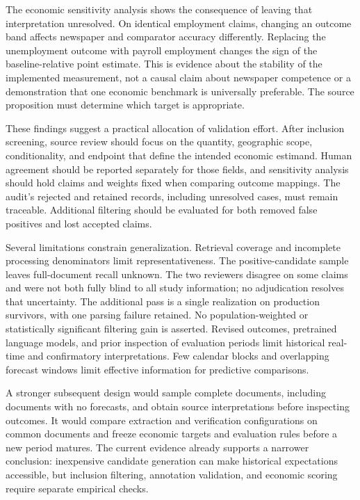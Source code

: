 \documentclass[iicol,pdflatex,sn-mathphys-num]{sn-jnl}
\begin{document}
The economic sensitivity analysis shows the consequence of leaving that interpretation unresolved. On identical employment claims, changing an outcome band affects newspaper and comparator accuracy differently. Replacing the unemployment outcome with payroll employment changes the sign of the baseline-relative point estimate. This is evidence about the stability of the implemented measurement, not a causal claim about newspaper competence or a demonstration that one economic benchmark is universally preferable. The source proposition must determine which target is appropriate.

These findings suggest a practical allocation of validation effort. After inclusion screening, source review should focus on the quantity, geographic scope, conditionality, and endpoint that define the intended economic estimand. Human agreement should be reported separately for those fields, and sensitivity analysis should hold claims and weights fixed when comparing outcome mappings. The audit's rejected and retained records, including unresolved cases, must remain traceable. Additional filtering should be evaluated for both removed false positives and lost accepted claims.

Several limitations constrain generalization. Retrieval coverage and incomplete processing denominators limit representativeness. The positive-candidate sample leaves full-document recall unknown. The two reviewers disagree on some claims and were not both fully blind to all study information; no adjudication resolves that uncertainty. The additional pass is a single realization on production survivors, with one parsing failure retained. No population-weighted or statistically significant filtering gain is asserted. Revised outcomes, pretrained language models, and prior inspection of evaluation periods limit historical real-time and confirmatory interpretations. Few calendar blocks and overlapping forecast windows limit effective information for predictive comparisons.

A stronger subsequent design would sample complete documents, including documents with no forecasts, and obtain source interpretations before inspecting outcomes. It would compare extraction and verification configurations on common documents and freeze economic targets and evaluation rules before a new period matures. The current evidence already supports a narrower conclusion: inexpensive candidate generation can make historical expectations accessible, but inclusion filtering, annotation validation, and economic scoring require separate empirical checks.
\end{document}
